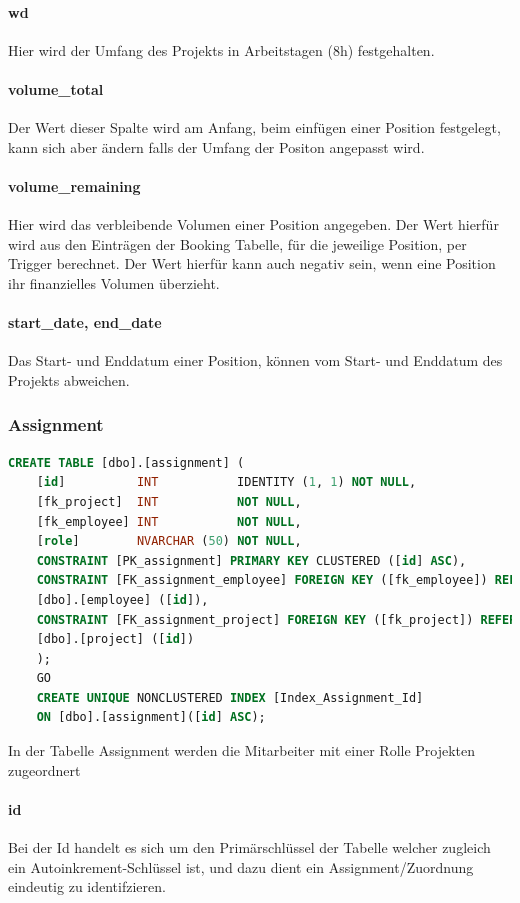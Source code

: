 \documentclass{article}
\begin{document}
\paragraph{wd} Hier wird der Umfang des Projekts in Arbeitstagen (8h) festgehalten.
\paragraph{volume\_total} Der Wert dieser Spalte wird am Anfang, beim einfügen einer Position festgelegt,
kann sich aber ändern falls der Umfang der Positon angepasst wird.
\paragraph{volume\_remaining} Hier wird das verbleibende Volumen einer Position angegeben. Der Wert hierfür
wird aus den Einträgen der Booking Tabelle, für die jeweilige Position, per
Trigger berechnet. Der Wert hierfür kann auch negativ sein, wenn eine Position
ihr finanzielles Volumen überzieht.
\paragraph{start\_date, end\_date} Das Start- und Enddatum einer Position, können vom Start- und Enddatum des
Projekts abweichen.

\subsubsection{Assignment}
\begin{lstlisting}[language=Sql, caption= Create Table Statement für Assignment Table]
    CREATE TABLE [dbo].[assignment] (
    [id]          INT           IDENTITY (1, 1) NOT NULL,
    [fk_project]  INT           NOT NULL,
    [fk_employee] INT           NOT NULL,
    [role]        NVARCHAR (50) NOT NULL,
    CONSTRAINT [PK_assignment] PRIMARY KEY CLUSTERED ([id] ASC),
    CONSTRAINT [FK_assignment_employee] FOREIGN KEY ([fk_employee]) REFERENCES
    [dbo].[employee] ([id]),
    CONSTRAINT [FK_assignment_project] FOREIGN KEY ([fk_project]) REFERENCES
    [dbo].[project] ([id])
    );
    GO
    CREATE UNIQUE NONCLUSTERED INDEX [Index_Assignment_Id]
    ON [dbo].[assignment]([id] ASC);


         \end{lstlisting}
In der Tabelle Assignment werden die Mitarbeiter mit einer Rolle Projekten
zugeordnert
\paragraph{id}Bei der Id handelt es sich um den Primärschlüssel der Tabelle welcher zugleich
ein Autoinkrement-Schlüssel ist, und dazu dient ein Assignment/Zuordnung
eindeutig zu identifzieren.
\end{document}
